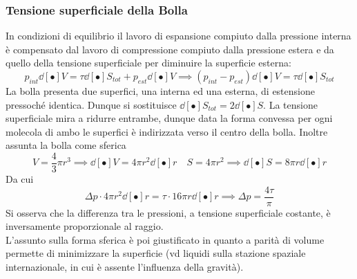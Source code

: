 \documentclass[10pt, oneside]{book}
\newcommand{\ds}{\displaystyle}
\begin{document}
\subsubsection*{Tensione superficiale della Bolla}
In condizioni di equilibrio il lavoro di espansione compiuto dalla pressione interna è compensato dal lavoro di compressione compiuto dalla pressione estera e da quello della tensione superficiale per diminuire la superficie esterna:
\[p_{int} \dd[•]{V} = \tau \dd[•]{S_{tot}} + p_{est} \dd[•]{V} \implies (p_{int} - p_{est})\dd[•]{V} = \tau \dd[•]{S_{tot}}\]
La bolla presenta due superfici, una interna ed una esterna, di estensione pressoché identica. Dunque si sostituisce $\ds \dd[•]{S_{tot}} = 2 \dd[•]{S}$. La tensione superficiale mira a ridurre entrambe, dunque data la forma convessa per ogni molecola di ambo le superfici è indirizzata verso il centro della bolla. Inoltre assunta la bolla come sferica
\[V = \frac{4}{3}\pi r^3 \implies \dd[•]{V} = 4 \pi r^2 \dd[•]{r} \quad S = 4 \pi r^2 \implies \dd[•]{S} = 8 \pi r \dd[•]{r}\]
Da cui
\[\Delta p \cdot 4 \pi r^2 \dd[•]{r} = \tau \cdot 16 \pi r \dd[•]{r} \implies
\boxed{\Delta p = \frac{4 \tau}{\pi}}\]
Si osserva che la differenza tra le pressioni, a tensione superficiale costante, è inversamente proporzionale al raggio.\\
L'assunto sulla forma sferica è poi giustificato in quanto a parità di volume permette di minimizzare la superficie (vd liquidi sulla stazione spaziale internazionale, in cui è assente l'influenza della gravità).
\end{document}
